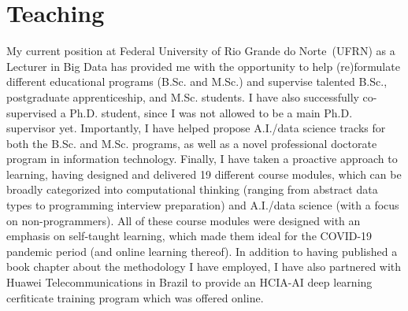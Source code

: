 \documentclass[11pt,a4paper,sans]{moderncv} %
\begin{document}





\section{Teaching}

My current position at Federal University of Rio Grande do Norte~(UFRN) as a Lecturer in Big Data has provided me with the opportunity to help (re)formulate different educational programs (B.Sc. and M.Sc.) and supervise talented B.Sc., postgraduate apprenticeship, and M.Sc. students. I have also successfully co-supervised a Ph.D. student, since I was not allowed to be a main Ph.D. supervisor yet. Importantly, I have helped propose A.I./data science tracks for both the B.Sc. and M.Sc. programs, as well as a novel professional doctorate program in information technology. Finally, I have taken a proactive approach to learning, having designed and delivered 19 different course modules, which can be broadly categorized into computational thinking (ranging from abstract data types to programming interview preparation) and A.I./data science (with a focus on non-programmers). All of these course modules were designed with an emphasis on self-taught learning, which made them ideal for the COVID-19 pandemic period (and online learning thereof). In addition to having published a book chapter about the methodology I have employed, I have also partnered with Huawei Telecommunications in Brazil to provide an HCIA-AI deep learning cerfiticate training program which was offered online.%

\end{document}
